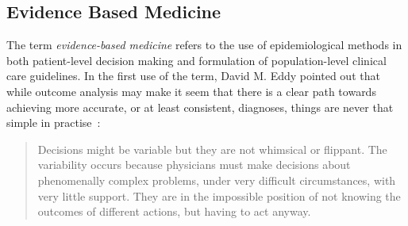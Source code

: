 \documentclass{sigchi}
\begin{document}



\subsection{Evidence Based Medicine}%

The term \emph{evidence-based medicine} refers to the use of epidemiological methods in both patient-level decision making and formulation of population-level clinical care guidelines.  In the first use of the term, David M. Eddy pointed out that while outcome analysis may make it seem that there is a clear path towards achieving more accurate, or at least consistent, diagnoses, things are never that simple in practise~\cite{eddy1990challenge}:

\begin{quote}
  Decisions might be variable but they are not whimsical or flippant. The variability occurs because physicians must make decisions about phenomenally complex problems, under very difficult circumstances, with very little support. They are in the impossible position of not knowing the outcomes of different actions, but having to act anyway.
\end{quote}
\end{document}
